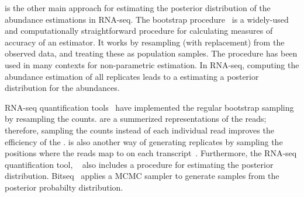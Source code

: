 \boots is the other main approach for estimating the posterior distribution of the abundance
estimations in RNA-seq. The bootstrap procedure~\citep{efron1979computers} is a widely-used 
and computationally straightforward procedure for calculating measures of accuracy of an 
estimator. It works by resampling (with replacement) from the observed data, and treating 
these as population samples. The procedure has been used in many contexts for non-parametric 
estimation. In RNA-seq, computing the abundance estimation of all \boot replicates leads to a 
estimating a posterior distribution for the abundances. 

RNA-seq quantification tools~\citep{kallisto,salmon} have implemented the regular bootstrap 
sampling by resampling the \eqc counts. \Eqcs are a summerized representations of the reads; 
therefore, sampling the \eqc counts instead of each individual read improves the efficiency 
of the \boots. \Pboots is also another way of generating \boot replicates by sampling the 
positions where the reads map to on each transcript~\citep{xiong2016probabilistic}.
Furthermore, the RNA-seq quantification tool, \salmon~\citep{salmon} also includes a \gibbs
procedure for estimating the posterior distribution.  Bitseq~\citep{glaus2012identifying} 
applies a MCMC \gib sampler to generate samples from the posterior probabilty distribution. 